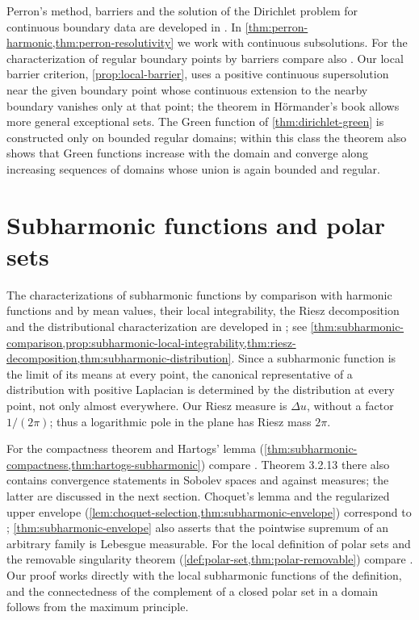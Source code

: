 Perron's method, barriers and the solution of the Dirichlet problem for continuous boundary data are developed in \cite[Section 3.3, especially Theorem 3.3.3, Definition 3.3.4 and Theorem 3.3.5]{Hor07}. In \cref{thm:perron-harmonic,thm:perron-resolutivity} we work with continuous subsolutions. For the characterization of regular boundary points by barriers compare also \cite[Theorem 3.4.17]{Hor07}. Our local barrier criterion, \cref{prop:local-barrier}, uses a positive continuous supersolution near the given boundary point whose continuous extension to the nearby boundary vanishes only at that point; the theorem in H\"ormander's book allows more general exceptional sets. The Green function of \cref{thm:dirichlet-green} is constructed only on bounded regular domains; within this class the theorem also shows that Green functions increase with the domain and converge along increasing sequences of domains whose union is again bounded and regular.

\section{Subharmonic functions and polar sets}
\label{sec:history-subharmonic}
The characterizations of subharmonic functions by comparison with harmonic functions and by mean values, their local integrability, the Riesz decomposition and the distributional characterization are developed in \cite[Theorem 3.2.3, Corollary 3.2.8 and Theorems 3.2.9--3.2.11]{Hor07}; see \cref{thm:subharmonic-comparison,prop:subharmonic-local-integrability,thm:riesz-decomposition,thm:subharmonic-distribution}. Since a subharmonic function is the limit of its means at every point, the canonical representative of a distribution with positive Laplacian is determined by the distribution at every point, not only almost everywhere. Our Riesz measure is $\Delta u$, without a factor $1/(2\pi)$; thus a logarithmic pole in the plane has Riesz mass $2\pi$.

For the compactness theorem and Hartogs' lemma (\cref{thm:subharmonic-compactness,thm:hartogs-subharmonic}) compare \cite[Theorems 3.2.12--3.2.13]{Hor07}. Theorem 3.2.13 there also contains convergence statements in Sobolev spaces and against measures; the latter are discussed in the next section. Choquet's lemma and the regularized upper envelope (\cref{lem:choquet-selection,thm:subharmonic-envelope}) correspond to \cite[Proposition 3.4.4]{Hor07}; \cref{thm:subharmonic-envelope} also asserts that the pointwise supremum of an arbitrary family is Lebesgue measurable. For the local definition of polar sets and the removable singularity theorem (\cref{def:polar-set,thm:polar-removable}) compare \cite[Definition 3.4.1 and Theorem 3.4.3]{Hor07}. Our proof works directly with the local subharmonic functions of the definition, and the connectedness of the complement of a closed polar set in a domain follows from the maximum principle.

